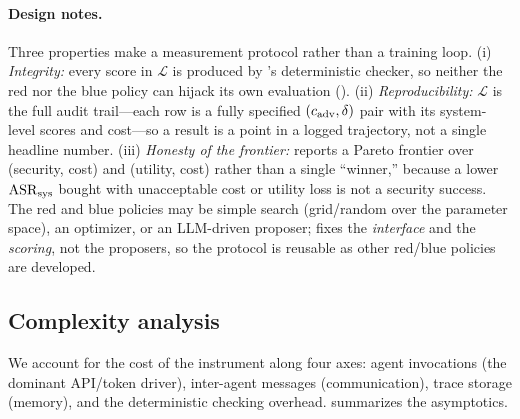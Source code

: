 \begin{algorithm}[t]
\caption{\corb: co-evolving red/blue evaluation.}
\label{alg:corb}
\algreset
{}
\Ind
{}
\Ded
{}
\end{algorithm}

\paragraph{Design notes.}
Three properties make \corb{} a measurement protocol rather than a training loop. (i)
\emph{Integrity:} every score in $\mathcal{L}$ is produced by 's
deterministic checker, so neither the red nor the blue policy can hijack its own
evaluation (). (ii) \emph{Reproducibility:} $\mathcal{L}$ is the full
audit trail---each row is a fully specified $(c_{\mathrm{adv}},\delta)$ pair with its
system-level scores and cost---so a result is a point in a logged trajectory, not a single
headline number. (iii) \emph{Honesty of the frontier:} \corb{} reports a Pareto frontier
over (security, cost) and (utility, cost) rather than a single ``winner,'' because a lower
$\mathrm{ASR}_{\mathrm{sys}}$ bought with unacceptable cost or utility loss is not a security success. The red
and blue policies may be simple search (grid/random over the parameter space), an
optimizer, or an LLM-driven proposer;  fixes the \emph{interface} and the
\emph{scoring}, not the proposers, so the protocol is reusable as other red/blue policies
are developed.

\subsection{Complexity analysis}
\label{sec:complexity}
We account for the cost of the instrument along four axes: agent invocations (the dominant
API/token driver), inter-agent messages (communication), trace storage (memory), and the
deterministic checking overhead.  summarizes the asymptotics.

